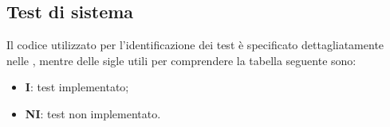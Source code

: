 \subsection{Test di sistema}
Il codice utilizzato per l'identificazione dei test è specificato dettagliatamente nelle , mentre delle sigle utili per comprendere la tabella seguente sono:
\begin{itemize}
	\item \textbf{I}: test implementato;
	\item \textbf{NI}: test non implementato.
\end{itemize} 

\renewcommand{\arraystretch}{1.5}
\renewcommand\extrarowheight{1.5pt}

